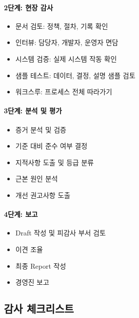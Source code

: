 \paragraph{2단계: 현장 감사}

\begin{itemize}
 \item 문서 검토: 정책, 절차, 기록 확인
 \item 인터뷰: 담당자, 개발자, 운영자 면담
 \item 시스템 검증: 실제 시스템 작동 확인
 \item 샘플 테스트: 데이터, 결정, 설명 샘플 검토
 \item 워크스루: 프로세스 전체 따라가기
\end{itemize}

\paragraph{3단계: 분석 및 평가}

\begin{itemize}
 \item 증거 분석 및 검증
 \item 기준 대비 준수 여부 결정
 \item 지적사항\cite{cobbe2021reviewable} 도출 및 등급 분류
 \item 근본 원인 분석
 \item 개선 권고사항 도출
\end{itemize}

\paragraph{4단계: 보고}

\begin{itemize}
 \item Draft 작성 및 피감사 부서 검토
 \item 이견 조율
 \item 최종 Report 작성
 \item 경영진 보고
\end{itemize}


\subsection{감사 체크리스트}
\label{sec:11.2.3}

